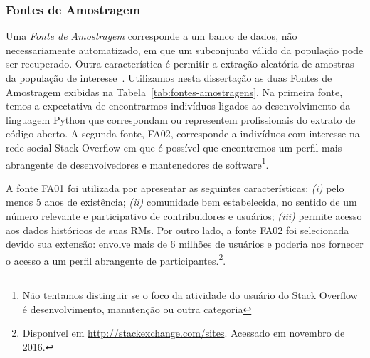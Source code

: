 \subsubsection{Fontes de Amostragem}\label{subsubsec:fontes_amostragem}

Uma \textit{Fonte de Amostragem} corresponde a um banco de dados, não
necessariamente automatizado, em que um subconjunto válido da população pode
ser recuperado. Outra característica é permitir a extração aleatória de
amostras da população de interesse~\cite{de2014towards}. Utilizamos nesta
dissertação as duas Fontes de Amostragem exibidas na
Tabela~\ref{tab:fontes-amostragens}. Na primeira fonte, temos a expectativa de
encontrarmos indivíduos ligados ao desenvolvimento da linguagem Python que
correspondam ou representem profissionais do extrato de código aberto. A
segunda fonte, FA02, corresponde a indivíduos com interesse na rede social
Stack Overflow em que é possível que encontremos um perfil mais abrangente de
desenvolvedores e mantenedores de software\footnote{Não tentamos distinguir se
    o foco da atividade do usuário do Stack Overflow é desenvolvimento,
    manutenção ou outra categoria}.

\begin{table}[htpb]
\centering
{}
\caption{Fontes de Amostragem utilizadas no estudo}\label{tab:fontes-amostragens}
\end{table}

A fonte FA01 foi utilizada por apresentar as seguintes características:
\textit{(i)} pelo menos 5 anos de existência; \textit{(ii)} comunidade bem
estabelecida, no sentido de um número relevante e participativo de
contribuidores e usuários; \textit{(iii)} permite acesso aos dados históricos
de suas RMs. Por outro lado, a fonte FA02 foi selecionada devido sua extensão:
envolve mais de 6 milhões de usuários e poderia nos fornecer o acesso a um
perfil abrangente de participantes.\footnote{Disponível em
    \url{http://stackexchange.com/sites}. Acessado em novembro de 2016.}.

